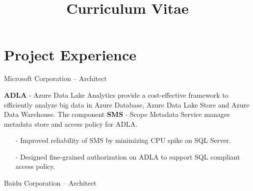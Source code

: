 \documentclass[10pt,a4paper]{moderncv}
\title{Curriculum Vitae }
\begin{document}
\maketitle


\section{Project Experience}
\vspace{2ex}
	{ Microsoft Corporation -- Architect}{}{}{}{}
	\vspace{1ex}
{
    \textbf{ADLA} - Azure Data Lake Analytics provide a cost-effective framework to efficiently analyze big data in Azure Database, Azure Data Lake Store and Azure Data Warehouse. The component \textbf{SMS} - Scope Metadata Service manages metadata store and access policy for ADLA.
    \begin{itemize}
		\item[-] Improved reliability of SMS by minimizing CPU spike on SQL Server.
		\item[-] Designed fine-grained authorization on ADLA to support SQL compliant access policy.
	\end{itemize}
}
\vspace{2ex}

	{ Baidu Corporation -- Architect}{}{}{}{}
	\vspace{1ex}
\end{document}
